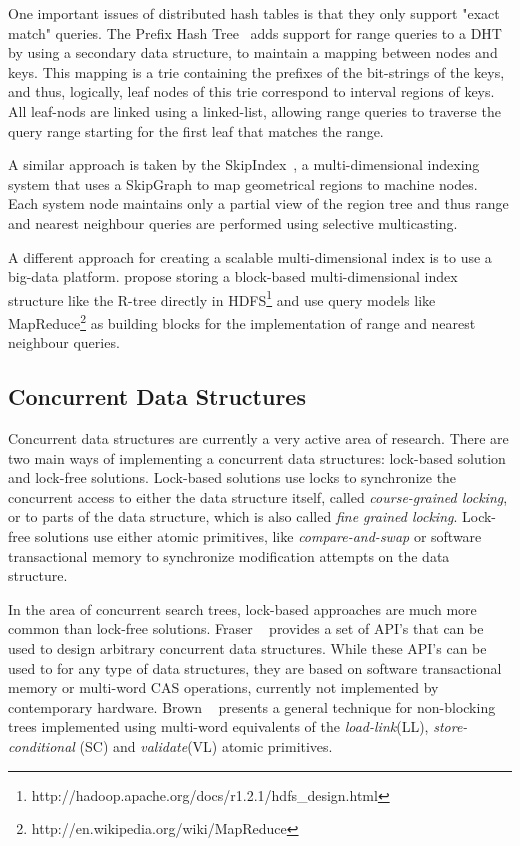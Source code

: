\documentclass[11pt,a4paper]{globis-book}
\begin{document}
One important issues of distributed hash tables is that they only support "exact match" queries. The Prefix Hash Tree~\cite{Ramabhadran04prefixhash} adds support for range queries to a DHT by using a secondary data structure, to maintain a mapping between nodes and keys. This mapping is a trie containing the prefixes of the bit-strings of the keys, and thus, logically, leaf nodes of this trie correspond to interval regions of keys. All leaf-nods are linked using a linked-list, allowing range queries to traverse the query range starting for the first leaf that matches the range. 

A similar approach is taken by the SkipIndex~\cite{Zhang04skipindex}, a multi-dimensional indexing system that uses a SkipGraph to map geometrical regions to machine nodes. Each system node maintains only a partial view of the region tree and thus range and nearest neighbour queries are performed using selective multicasting.

A different approach for creating a scalable multi-dimensional index is to use a big-data platform. \cite{Liao2010HadoopIndex} propose storing a block-based multi-dimensional index structure like the R-tree directly in HDFS\footnote{http://hadoop.apache.org/docs/r1.2.1/hdfs\_design.html} and use query models like MapReduce\footnote{http://en.wikipedia.org/wiki/MapReduce} as building blocks for the implementation of range and nearest neighbour queries.

\subsection{Concurrent Data Structures}

Concurrent data structures are currently a very active area of research. There are two main ways of implementing a concurrent data structures: lock-based solution and lock-free solutions. Lock-based solutions use locks to synchronize the concurrent access to either the data structure itself, called \textit{course-grained locking}, or to parts of the data structure, which is also called \textit{fine grained locking}. Lock-free solutions use either atomic primitives, like \textit{compare-and-swap} or software transactional memory to synchronize modification attempts on the data structure.

In the area of concurrent search trees, lock-based approaches are much more common than lock-free solutions. Fraser ~\cite{Fraser2007concurrent} provides a set of API's that can be used to design arbitrary concurrent data structures. While these API's can be used to for any type of data structures, they are based on software transactional memory or multi-word CAS operations, currently not implemented by contemporary hardware. Brown ~\cite{Brown2014concurrent} presents a general technique for non-blocking trees implemented using multi-word equivalents of the \textit{load-link}(LL), \textit{store-conditional} (SC) and \textit{validate}(VL) atomic primitives.
\end{document}

